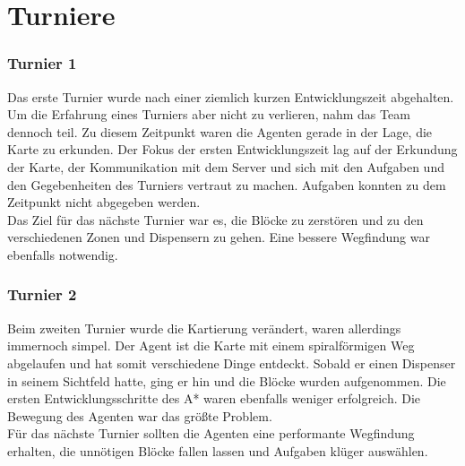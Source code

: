 \section{Turniere}

\subsubsection{Turnier 1}
Das erste Turnier wurde nach einer ziemlich kurzen Entwicklungszeit abgehalten. Um die Erfahrung eines Turniers aber nicht zu verlieren, nahm das Team dennoch teil. Zu diesem Zeitpunkt waren die Agenten gerade in der Lage, die Karte zu erkunden. Der Fokus der ersten Entwicklungszeit lag auf der Erkundung der Karte, der Kommunikation mit dem Server und sich mit den Aufgaben und den Gegebenheiten des Turniers vertraut zu machen. Aufgaben konnten zu dem Zeitpunkt nicht abgegeben werden.\\
Das Ziel für das nächste Turnier war es, die Blöcke zu zerstören und zu den verschiedenen Zonen und Dispensern zu gehen. Eine bessere Wegfindung war ebenfalls notwendig.

%

\subsubsection{Turnier 2}
Beim zweiten Turnier wurde die Kartierung verändert, waren allerdings immernoch simpel. Der Agent ist die Karte mit einem spiralförmigen Weg abgelaufen und hat somit verschiedene Dinge entdeckt. Sobald er einen Dispenser in seinem Sichtfeld hatte, ging er hin und die Blöcke wurden aufgenommen. Die ersten Entwicklungsschritte des A* waren ebenfalls weniger erfolgreich. Die Bewegung des Agenten war das größte Problem. \\
Für das nächste Turnier sollten die Agenten eine performante Wegfindung erhalten, die unnötigen Blöcke fallen lassen und Aufgaben klüger auswählen.

